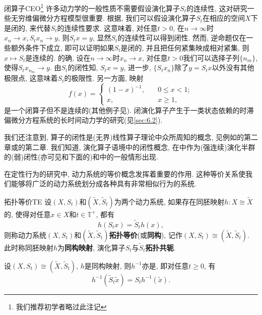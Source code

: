 \begin{remark}{闭算子}{CEO}\footnote{我们推荐初学者略过此注记}
	许多动力学的一般性质不需要假设演化算子$S_{t}$的连续性, 这对研究一些无穷维偏微分方程模型很重要. 根据\cite{Pata07}, 我们可以假设演化算子$S_{t}$在相应的空间$X$下是闭的, 来代替$S_{t}$的连续性要求. 这意味着, 对任意$t>0$, 在$n\to\infty$时$x_{n}\to x, S_{t}x_{n}\to y$, 则$S_{t}x=y$, 显然$S_{t}$的连续性可以得到闭性. 然而, 逆命题仅在一些额外条件下成立, 即可以证明如果$S_{t}$是闭的, 并且把任何紧集映成相对紧集, 则$x\mapsto S_{t}$是连续的. 的确, 设在$n\to\infty$时$x_{n}\to x$, 对任意$t>0$我们可以选择子列$\{n_{m}\}$, 使得$S_{t}x_{n_{m}}\to y$. 由$S_{t}$的闭性知, $S_{t}x=y$, 进一步, $\{S_{t}x_{n}\}$除了$y=S_{t}x$以外没有其他极限点, 这意味着$S_{t}$的极限性. 另一方面, 映射$$f(x)=\begin{cases}(1-x)^{-1},&\quad 0\leqslant x<1;\\x,&\quad x\geqslant 1,\end{cases}$$是一个闭算子但不是连续的(其他例子见\cite{Pata07}). 闭演化算子产生于一类状态依赖的时滞偏微分方程系统的长时间动力学的研究(见\ref{sec:6.2}).
	
	我们还注意到, 算子的闭性是(无界)线性算子理论中众所周知的概念, 见例如\cite{Dunford58}的第二章或\cite{Yosida74}的第二章. 我们知道, 演化算子语境中的闭性概念, 在\cite{Babin92}中作为(强连续)演化半群的(弱)闭性(亦可见\cite{Chueshov99}和下面的)和\cite{Pata07}中的一般情形出现. 
\end{remark}

在定性行为的研究中, 动力系统的等价概念发挥着重要的作用. 这种等价关系使我们能够将广泛的动力系统划分成各种具有非常相似行为的系统. 

\begin{definition}{拓扑等价}{TE}
	设$(X,S_{t})$和$(\tilde{X},\tilde{S}_{t})$为两个动力系统, 如果存在同胚映射$h: X\cong\tilde{X}$的, 使得对任意$x\in X$和$t\in\mathbb{T}^{+}$, 都有$$
	h(S_{t}x)=\tilde{S}_{t}h(x),$$则称动力系统$(X,S_{t})$和$(\tilde{X},\tilde{S}_{t})$\textbf{拓扑等价}(或\textbf{同构}), 记作$(X,S_{t})\cong (\tilde{X},\tilde{S}_{t})$.  此时称同胚映射$h$为\textbf{同构映射}, 演化算子$S_{t}$与$\tilde{S}_{t}$\textbf{拓扑共轭}.  
\end{definition}

\begin{exercise}\label{exe:ISO}
	设$(X,S_{t})\cong(\tilde{X},\tilde{S}_{t})$, $h$是同构映射, 则$h^{-1}$亦是, 即对任意$t\geqslant 0$, 有$$h^{-1}(\tilde{S}_{t}\tilde{x})=S_{t}h^{-1}(\tilde{x}).$$
\end{exercise}

